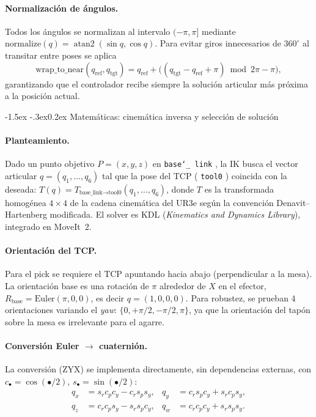 \documentclass[12pt,a4paper]{article}
\makeatletter
\renewcommand\subsubsection{\@startsection{subsubsection}{3}{\z@}%
  {-1.5ex \@plus -.3ex}{0.2ex}%
  {\normalsize\bfseries\color{MediumBlue}}}
\newcommand{\code}[1]{%
  \begingroup
  \def\_{\char`_\penalty0 }%
  \def\/{\char`/\penalty0 }%
  \texttt{\small #1}%
  \endgroup}
\makeatother
\begin{document}
\paragraph{Normalización de ángulos.}
Todos los ángulos se normalizan al intervalo $(-\pi,\pi]$ mediante
$\mathrm{normalize}(q)=\operatorname{atan2}(\sin q,\cos q)$. Para evitar giros innecesarios de $360^\circ$
al transitar entre poses se aplica
\begin{equation}
\mathrm{wrap\_to\_near}(q_{\text{ref}},q_{\text{tgt}})
= q_{\text{ref}} + \bigl((q_{\text{tgt}}-q_{\text{ref}}+\pi)\bmod 2\pi - \pi\bigr),
\end{equation}
garantizando que el controlador recibe siempre la solución articular más próxima a la posición actual.


\subsubsection{Matemáticas: cinemática inversa y selección de solución}

\paragraph{Planteamiento.}
Dado un punto objetivo $P=(x,y,z)$ en \code{base\_link}, la IK busca el vector articular
$q=(q_1,\dots,q_6)$ tal que la pose del TCP (\code{tool0}) coincida con la deseada:
$T(q)=T_{\text{base\_link}\to\text{tool0}}(q_1,\dots,q_6)$, donde $T$ es la transformada homogénea
$4\times4$ de la cadena cinemática del UR3e según la convención Denavit--Hartenberg modificada. El solver
es KDL (\textit{Kinematics and Dynamics Library}), integrado en MoveIt~2.

\paragraph{Orientación del TCP.}
Para el pick se requiere el TCP apuntando hacia abajo (perpendicular a la mesa). La orientación base es
una rotación de $\pi$ alrededor de $X$ en el efector, $R_{\text{base}}=\mathrm{Euler}(\pi,0,0)$, es decir
$q=(1,0,0,0)$. Para robustez, se prueban 4 orientaciones variando el \textit{yaw}:
$\{0,+\pi/2,-\pi/2,\pi\}$, ya que la orientación del tapón sobre la mesa es irrelevante para el agarre.

\paragraph{Conversión Euler $\rightarrow$ cuaternión.}
La conversión (ZYX) se implementa directamente, sin dependencias externas, con
$c_\bullet=\cos(\bullet/2)$, $s_\bullet=\sin(\bullet/2)$:
\begin{align}
q_x &= s_r c_p c_y - c_r s_p s_y, &
q_y &= c_r s_p c_y + s_r c_p s_y,\\
q_z &= c_r c_p s_y - s_r s_p c_y, &
q_w &= c_r c_p c_y + s_r s_p s_y.
\end{align}
\end{document}
